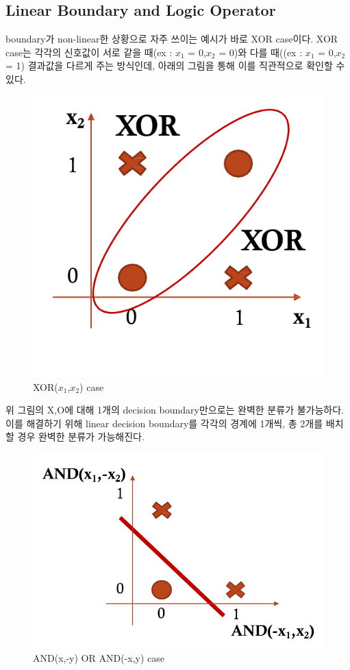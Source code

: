 \documentclass[draft=false]{oblivoir}
\begin{document}
\subsection{Linear Boundary and Logic Operator}
boundary가 non-linear한 상황으로 자주 쓰이는 예시가 바로 XOR case이다. XOR case는 각각의 신호값이 서로 같을 때(ex : $x_{1}$ = 0,$x_{2}$ = 0)와 다를 때((ex : $x_{1}$ = 0,$x_{2}$ = 1) 결과값을 다르게 주는 방식인데, 아래의 그림을 통해 이를 직관적으로 확인할 수 있다.
\begin{figure}[ht] \centering 
\includegraphics[scale=0.5]{fig14_11.png} 
\caption{XOR($x_{1}$,$x_{2}$) case}
\label{fig:14-11}
\end{figure}
위 그림의 X,O에 대해 1개의 decision boundary만으로는 완벽한 분류가 불가능하다. 이를 해결하기 위해 linear decision boundary를 각각의 경계에 1개씩, 총 2개를 배치할 경우 완벽한 분류가 가능해진다. 
\begin{figure}[ht] \centering 
\includegraphics[scale=0.5]{fig14_12.png} 
\caption{AND(x,-y) OR AND(-x,y) case}
\label{fig:14-12}
\end{figure}\\
\end{document}
